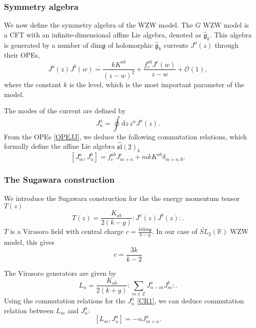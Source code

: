 \documentclass[10pt,a4paper]{article}
\numberwithin{equation}{section}
\begin{document}
\subsubsection*{Symmetry algebra}
We now define the symmetry algebra of the WZW model. 
The $G$ WZW model is a CFT with an infinite-dimensional affine Lie algebra, denoted as $\hat{\mathfrak{g}}_{k}$. 
This algebra is generated by a number of dim$\mathfrak{g}$ of 
holomorphic $\hat{\mathfrak{g}}_{k}$ currents $J^{a}(z)$ through their OPEs,
\begin{equation}
    \boxed{
        J^{a}(z)J^{b}(w) = \frac{kK^{ab}}{(z-w)^{2}} + \frac{f^{ab}_{c} J^{c}(w)}{z-w} + \mathcal{O}(1), \label{OPEJJ}
        }
\end{equation}
where the constant $k$ is the level, which is the most important parameter of the model. 

The modes of the current are defined by 
\begin{equation}
    J^{a}_{n} = \oint \mathrm{d}z \, z^{n} J^{a}(z).
\end{equation}
From the OPEs \eqref{OPEJJ}, we deduce the following commutation relations, 
which formally define the affine Lie algebra $\widehat{\mathfrak{sl}}(2)_{k}$
\begin{equation}
    \boxed{
        \left[ J^{a}_{m}, J^{b}_{n} \right] = f^{ab}_{c} J^{c}_{m+n} + m k K^{ab} \delta_{m+n,0}. \label{CR1}
    }
\end{equation}

\subsubsection*{The Sugawara construction}
We introduce the Sugawara construction for the the energy momentum tensor $T(z)$
\begin{equation}
    \boxed{
        T(z) = \frac{K_{ab}}{2(k-g)} : J^{a}(z) J^{b}(z) : . \label{EM}
        } 
\end{equation}
$T$ is a Virasoro field with central charge $c = \frac{k \mathrm{dim} \mathfrak{g}}{k-g}$. In our case of $\widetilde{SL}_{2}(\mathbb{R})$ 
WZW model, this gives 
\begin{equation}
    \boxed{
        c = \frac{3k}{k-2}
        }
\end{equation}

The Virasoro generators are given by
\begin{equation}
    L_{n} = \frac{K_{ab}}{2(k+g)} : \sum_{m \in \mathbb{Z} } J^{a}_{n-m} J^{b}_{m} :. \label{DefLn}
\end{equation}
Using the commutation relations for the $J^{a}_{n}$ \eqref{CR1}, we can deduce commutation relation between $L_{m}$ and $J^{a}_{n}$:
\begin{equation}
    \boxed{
            \left[ L_{m}, J^{a}_{n} \right] = -n J^{a}_{m+n}. \label{CR2}
    }
\end{equation}
\end{document}

